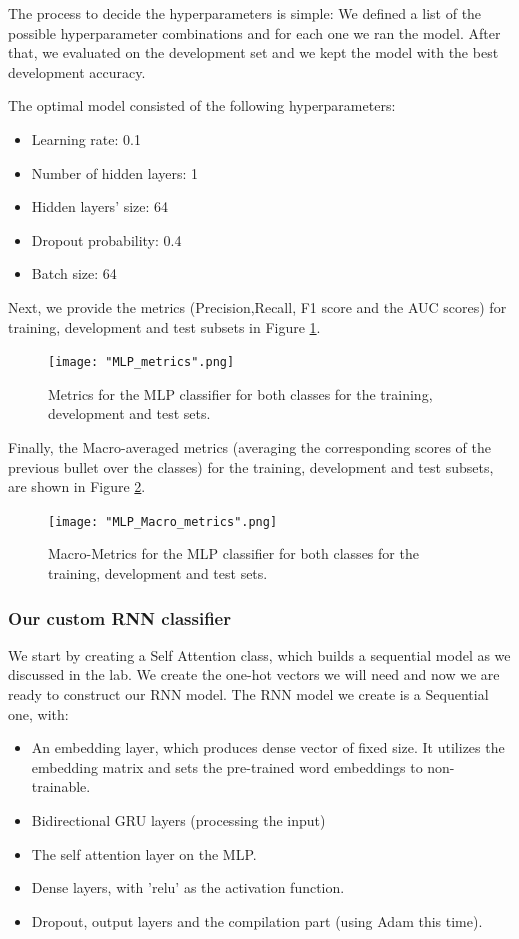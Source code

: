 \documentclass[10pt, a4paper]{article}
\begin{document}
	The process to decide the hyperparameters is simple: We defined a list of the possible hyperparameter combinations and for each one we ran the model. After that, we evaluated on the development set and we kept the model with the best development accuracy.
	
	
	The optimal model consisted of the following hyperparameters:
	\begin{itemize}
		\item Learning rate: 0.1
		\item Number of hidden layers: 1
		\item Hidden layers' size: 64
		\item Dropout probability: 0.4
		\item Batch size: 64
	\end{itemize}
	
	
	Next, we provide the metrics (Precision,Recall, F1 score and the AUC scores) for training, development and test subsets in Figure \ref{fig::mlp_metrics}.
	
	\begin{figure}
		\centering
		\texttt{[image: "MLP\_metrics".png]}
		\caption{Metrics for the MLP classifier for both classes for the training, development and test sets.}
		\label{fig::mlp_metrics}
	\end{figure}
	
	Finally,  the Macro-averaged metrics (averaging the corresponding scores of the previous bullet over the classes) for the training, development and test subsets, are shown in Figure \ref{fig::mlp_macro_metrics}.
	
	\begin{figure}
		\centering
		\texttt{[image: "MLP\_Macro\_metrics".png]}
		\caption{Macro-Metrics for the MLP classifier for both classes for the training, development and test sets.}
		\label{fig::mlp_macro_metrics}
	\end{figure}
	
	\subsubsection{Our custom RNN classifier}
	We start by creating a Self Attention class, which builds a sequential model as we discussed in the lab. We create the one-hot vectors we will need and now we are ready to construct our RNN model. The RNN model we create is a Sequential one, with:
	\begin{itemize}
		\item An embedding layer, which produces dense vector of fixed size. It utilizes the embedding matrix and sets the pre-trained word embeddings to non-trainable.
		\item Bidirectional GRU layers (processing the input)
		\item The self attention layer on the MLP.
		\item Dense layers, with 'relu' as the activation function.
		\item Dropout, output layers and the compilation part (using Adam this time).
	\end{itemize}
	
\end{document}
